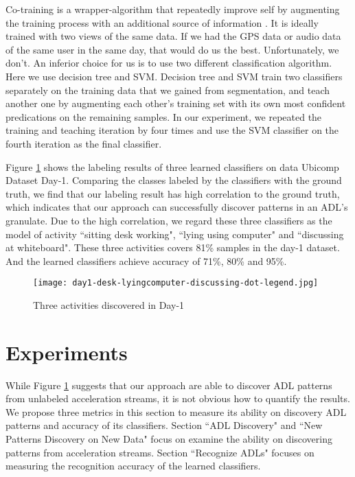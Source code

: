\documentclass{sigchi}
\begin{document}
    Co-training is a wrapper-algorithm that repeatedly improve self by augmenting the training process with an additional source of information \cite{stikic2008exploring}.
    It is ideally trained with two views of the same data.
    If we had the GPS data or audio data of the same user in the same day, that would do us the best.
    Unfortunately, we don't.
    An inferior choice for us is to use two different classification algorithm.
    Here we use decision tree and SVM.
    Decision tree and SVM train two classifiers separately on the training data that we gained from segmentation, and teach another one by augmenting each other's training set with its own most confident predications on the remaining samples.
    In our experiment, we repeated the training and teaching iteration by four times and use the SVM classifier on the fourth iteration as the final classifier.

    Figure \ref{fig: day1-result} shows the labeling results of three learned classifiers on data Ubicomp Dataset Day-1.
    Comparing the classes labeled by the classifiers with the ground truth, we find that our labeling result has high correlation to the ground truth, which indicates that our approach can successfully discover patterns in an ADL's granulate.
    Due to the high correlation, we regard these three classifiers as the model of activity ``sitting desk working", ``lying using computer" and ``discussing at whiteboard".
    These three activities covers 81\% samples in the day-1 dataset.
    And the learned classifiers achieve accuracy of 71\%, 80\% and 95\%.

\begin{figure}
    \centering
  \texttt{[image: day1-desk-lyingcomputer-discussing-dot-legend.jpg]}
    \caption{Three activities discovered in Day-1}
    \label{fig: day1-result}
\end{figure}


\section{Experiments}
\label{sec.experiments}

    While Figure \ref{fig: day1-result} suggests that our approach are able to discover ADL patterns from unlabeled acceleration streams, it is not obvious how to quantify the results.
    We propose three metrics in this section to measure its ability on discovery ADL patterns and accuracy of its classifiers.
    Section ``ADL Discovery" and ``New Patterns Discovery on New Data" focus on examine the ability on discovering patterns from acceleration streams.
    Section ``Recognize ADLs" focuses on measuring the recognition accuracy of the learned classifiers.
\end{document}
